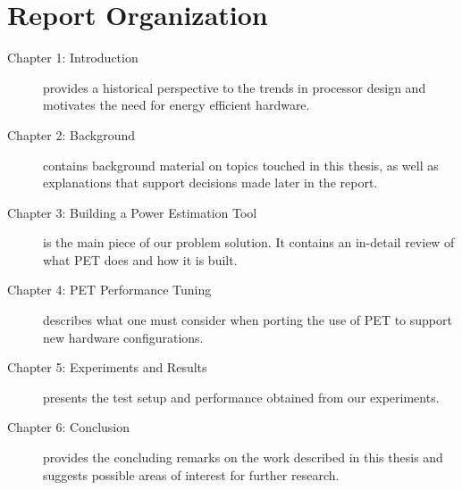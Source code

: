 \section{Report Organization}


\begin{description}
    \item[Chapter 1: Introduction] provides a historical perspective to the
        trends in processor design and motivates the need for energy efficient
        hardware.
    \item[Chapter 2: Background] contains background material on topics touched
        in this thesis, as well as explanations that support decisions made
        later in the report.
    \item[Chapter 3: Building a Power Estimation Tool] is the main piece of our
        problem solution. It contains an in-detail review of what PET does and
        how it is built.
    \item[Chapter 4: PET Performance Tuning] describes what one must consider
        when porting the use of PET to support new hardware configurations.
    \item[Chapter 5: Experiments and Results] presents the test setup and
        performance obtained from our experiments.
    \item[Chapter 6: Conclusion] provides the concluding remarks on the work
        described in this thesis and suggests possible areas of interest for
        further research.
\end{description}

